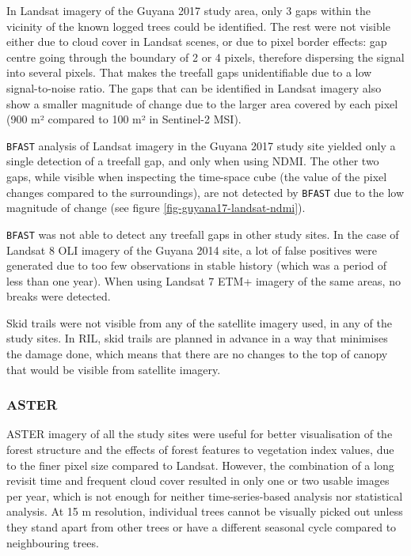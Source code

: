 \documentclass[a4paper,12pt]{scrbook}
\begin{document}
In Landsat imagery of the Guyana 2017 study area, only 3 gaps within the vicinity of the known logged trees could be identified. The rest were not visible either due to cloud cover in Landsat scenes, or due to pixel border effects: gap centre going through the boundary of 2 or 4 pixels, therefore dispersing the signal into several pixels. That makes the treefall gaps unidentifiable due to a low signal-to-noise ratio. The gaps that can be identified in Landsat imagery also show a smaller magnitude of change due to the larger area covered by each pixel (900 m² compared to 100 m² in Sentinel-2 \ac{MSI}).

\texttt{BFAST} analysis of Landsat imagery in the Guyana 2017 study site yielded only a single detection of a treefall gap, and only when using \ac{NDMI}. The other two gaps, while visible when inspecting the time-space cube (the value of the pixel changes compared to the surroundings), are not detected by \texttt{BFAST} due to the low magnitude of change (see figure \ref{fig-guyana17-landsat-ndmi}).

\texttt{BFAST} was not able to detect any treefall gaps in other study sites. In the case of Landsat 8 \ac{OLI} imagery of the Guyana 2014 site, a lot of false positives were generated due to too few observations in stable history (which was a period of less than one year). When using Landsat 7 \ac{ETM+} imagery of the same areas, no breaks were detected.

Skid trails were not visible from any of the satellite imagery used, in any of the study sites. In \ac{RIL}, skid trails are planned in advance in a way that minimises the damage done, which means that there are no changes to the top of canopy that would be visible from satellite imagery.


\subsubsection{ASTER}


\ac{ASTER} imagery of all the study sites were useful for better visualisation of the forest structure and the effects of forest features to vegetation index values, due to the finer pixel size compared to Landsat. However, the combination of a long revisit time and frequent cloud cover resulted in only one or two usable images per year, which is not enough for neither time-series-based analysis nor statistical analysis. At 15 m resolution, individual trees cannot be visually picked out unless they stand apart from other trees or have a different seasonal cycle compared to neighbouring trees.
\end{document}

